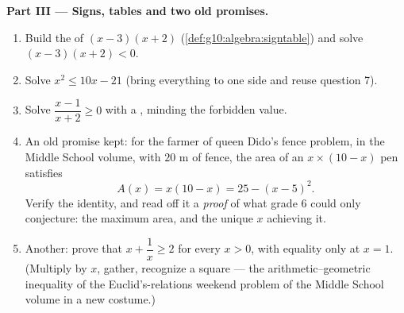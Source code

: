 \begin{problem}[{Weekend problem --- sum-and-product problems,
completing the square the way al-Khwarizmi drew it, and the
equation $x^2 = x + 1$}]
\medskip
\noindent\textbf{Part III --- Signs, tables and two old
promises.}
\begin{enumerate}[resume]
  \item Build the  of $(x - 3)(x + 2)$
        (\cref{def:g10:algebra:signtable}) and solve
        $(x - 3)(x + 2) < 0$.
  \item Solve $x^2 \leq 10x - 21$ (bring everything to one side
        and reuse question 7).
  \item Solve $\dfrac{x - 1}{x + 2} \geq 0$ with a ,
        minding the forbidden value.
  \item An old promise kept: for the farmer of
        queen Dido's fence problem, in the Middle School volume, with $20$ m of fence, the area
        of an $x \times (10 - x)$ pen satisfies
        \[
        A(x) = x(10 - x) = 25 - (x - 5)^2 .
        \]
        Verify the identity, and read off it a \emph{proof} of
        what grade 6 could only conjecture: the maximum area,
        and the unique $x$ achieving it.
  \item Another: prove that $x + \dfrac1x \geq 2$ for every
        $x > 0$, with equality only at $x = 1$. (Multiply by
        $x$, gather, recognize a square --- the
        arithmetic--geometric inequality of
        the Euclid's-relations weekend problem of the Middle School volume in a new costume.)
\end{enumerate}


\end{problem}
